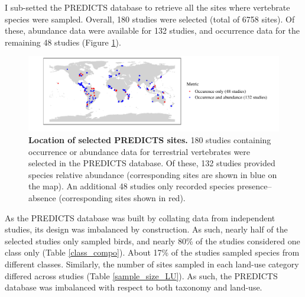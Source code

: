 I sub-setted the PREDICTS database to retrieve all the sites where vertebrate species were sampled.  Overall, 180 studies were selected (total of 6758 sites). Of these, abundance data were available for 132 studies, and occurrence data for the remaining 48 studies (Figure \ref{PREDICTS_maps}).

\begin{figure}[h!]
\centering
\includegraphics[scale=0.75]{figures/chapter3/Sites}
\caption[Location of selected PREDICTS sites]{\textbf{Location of selected PREDICTS sites.} 180 studies containing occurrence or abundance data for terrestrial vertebrates were selected in the PREDICTS database. Of these, 132 studies provided species relative abundance (corresponding sites are shown in blue on the map). An additional 48 studies only recorded species presence--absence (corresponding sites shown in red).}
\label{PREDICTS_maps}
\end{figure}

As the PREDICTS database was built by collating data from independent studies, its design was imbalanced by construction. As such, nearly half of the selected studies only sampled birds, and nearly 80\% of the studies considered one class only (Table \ref{class_compo}). About 17\% of the studies sampled species from different classes. Similarly, the number of sites sampled in each land-use category differed across studies (Table \ref{sample_size_LU}). As such, the PREDICTS database was imbalanced with respect to both taxonomy and land-use.

